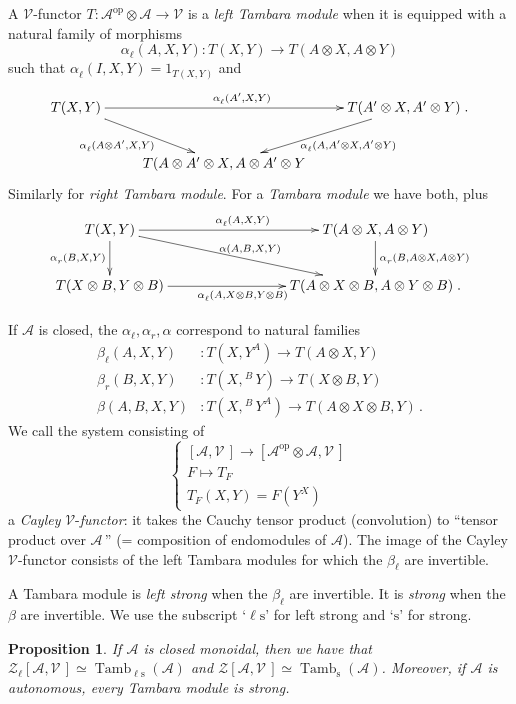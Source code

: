 \documentclass[a4paper,12pt]{article}
\newtheorem*{Proposition}{Proposition}
\theoremstyle{definition}
\theoremstyle{fact}
\theoremstyle{genquest}
\theoremstyle{step}
\newcommand{\catA}{\mathcal{A}}
\newcommand{\Tamb}{\operatorname{Tamb}}
\newcommand{\TambLS}{\Tamb_{\ell\mathrm{s}}}
\newcommand{\TambS}{\Tamb_{\mathrm{s}}}
\newcommand{\catV}{\mathcal{V}}
\newcommand{\catZ}{\mathcal{Z}}%
\newcommand{\elless}{\ell\mathrm{s}}
\newcommand{\ess}{\mathrm{s}}
\newcommand{\op}{\operatorname{op}}
\newcommand{\longto}{\longrightarrow}
\begin{document}
\medskip\noindent 
A $\catV$-functor $T : \catA^{\op}  \otimes \catA \to  \catV$ is a \emph{left Tambara module} 
when it is equipped with a natural family of morphisms
 \[
 \alpha^{}_\ell (A,X,Y) : T(X,Y) \to T (A\otimes X, A \otimes Y)
 \]
such that $\alpha^{}_\ell (I,X,Y) = 1_{T(X,Y)}$ and 
\[ \xymatrix{
T(X,Y) \ar[rd]_{\alpha^{}_\ell (A\otimes A',X,Y)\phantom{AAA}} \ar[rr]^{\alpha^{}_\ell (A',X,Y)}  
 && T(A'\otimes X, A' \otimes Y) \ar[ld]^{\phantom{AAA}\alpha^{}_\ell (A,A'\otimes X, A' \otimes Y)} \;.
\\
&T(A\otimes A' \otimes X, A \otimes A' \otimes Y }
\]
Similarly for \emph{right Tambara module}.   
For a \emph{Tambara module} we have both, plus 
\[ \xymatrix{
 T(X,Y) \ar[rrrd]^{\alpha(A,B,X,Y)} \ar[d]_{\alpha^{}_r (B,X,Y)}   \ar[rrr]^{\alpha^{}_\ell (A,X,Y)} 
  &&& T(A\otimes X,A\otimes Y) \ar[d]^{\alpha^{}_r (B,A\otimes X,A\otimes Y)}
\\
 T(X\otimes B,Y\otimes B)  \ar[rrr]_{\alpha^{}_\ell (A,X\otimes B, Y\otimes B)} 
  &&& T(A\otimes X\otimes B, A \otimes Y \otimes B) \;.
}\]

\bigskip\noindent 
If $\catA$ is closed, the $\alpha^{}_\ell, \alpha^{}_r, \alpha$ correspond to natural families
\begin{align*}
\beta_\ell (A,X,Y) &: T(X,Y^A) \longto T (A \otimes X,Y) \qquad
\\
\beta_r (B,X,Y) &: T(X,^{\; B}\!Y) \longto T (X \otimes B,Y) \qquad 
\\
\beta (A,B,X,Y) &: T(X,^{\; B}\!Y^A) \longto T (A \otimes X \otimes B,Y)\,.
\end{align*}
We call the system consisting of
\[ \begin{cases}
[\catA,\catV\,]  \longto  [\catA^{\op} \otimes \catA,\catV\,]
\\
F  \longmapsto T_F 
\\
T_F (X,Y) = F(Y^X)  
\end{cases}
\]
a \emph{Cayley} $\catV$-\emph{functor}: 
it takes the Cauchy tensor product (convolution) to ``tensor product over $\catA\,$'' 
(= composition of endomodules of $\catA$).   
The image of the Cayley $\catV$-functor consists of the left Tambara modules for which the $\beta_\ell$ are invertible.


A Tambara module is \emph{left strong} when the $\beta_\ell$ are invertible.   
It is \emph{strong} when the $\beta$ are invertible. 
We use the subscript `$\elless$' for left strong and `$\ess$' for strong.

\begin{Proposition}
If $\catA$ is closed monoidal, then we have that
$\catZ_\ell [\catA,\catV\,] \simeq \TambLS (\catA)$ and  %
$\catZ [\catA,\catV\,]        \simeq \TambS (\catA)$.
%
Moreover, if $\catA$ is autonomous, every Tambara module is strong.
\end{Proposition}
\end{document}

